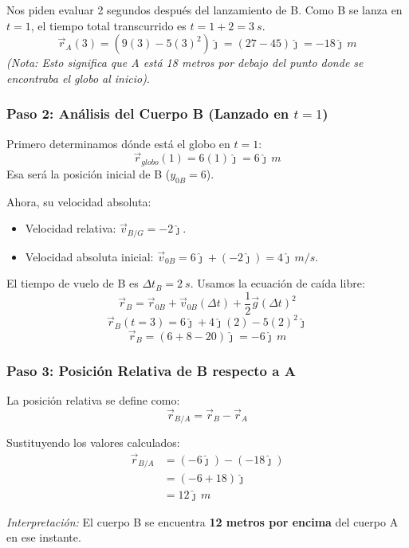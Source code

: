 \documentclass[12pt, a4paper]{article}
\begin{document}
Nos piden evaluar 2 segundos después del lanzamiento de B. Como B se lanza en $t=1$, el tiempo total transcurrido es $t = 1 + 2 = \SI{3}{s}$.
$$ \vec{r}_A(3) = (9(3) - 5(3)^2)\hat{\jmath} = (27 - 45)\hat{\jmath} = -18\hat{\jmath} \, \si{m} $$
\textit{(Nota: Esto significa que A está 18 metros por debajo del punto donde se encontraba el globo al inicio)}.

\subsubsection*{Paso 2: Análisis del Cuerpo B (Lanzado en $t=1$)}
Primero determinamos dónde está el globo en $t=1$:
$$ \vec{r}_{globo}(1) = 6(1)\hat{\jmath} = 6\hat{\jmath} \, \si{m} $$
Esa será la posición inicial de B ($y_{0B} = 6$).

Ahora, su velocidad absoluta:
\begin{itemize}
    \item Velocidad relativa: $\vec{v}_{B/G} = -2\hat{\jmath}$.
    \item Velocidad absoluta inicial: $\vec{v}_{0B} = 6\hat{\jmath} + (-2\hat{\jmath}) = 4\hat{\jmath} \, \si{m/s}$.
\end{itemize}

El tiempo de vuelo de B es $\Delta t_B = \SI{2}{s}$. Usamos la ecuación de caída libre:
$$ \vec{r}_B = \vec{r}_{0B} + \vec{v}_{0B}(\Delta t) + \frac{1}{2}\vec{g}(\Delta t)^2 $$
$$ \vec{r}_B(t=3) = 6\hat{\jmath} + 4\hat{\jmath}(2) - 5(2)^2\hat{\jmath} $$
$$ \vec{r}_B = (6 + 8 - 20)\hat{\jmath} = -6\hat{\jmath} \, \si{m} $$

\subsubsection*{Paso 3: Posición Relativa de B respecto a A}
La posición relativa se define como:
\begin{equation}
    \vec{r}_{B/A} = \vec{r}_B - \vec{r}_A
\end{equation}

Sustituyendo los valores calculados:
\begin{align*}
    \vec{r}_{B/A} &= (-6\hat{\jmath}) - (-18\hat{\jmath}) \\
    &= (-6 + 18)\hat{\jmath} \\
    &= 12\hat{\jmath} \, \si{m}
\end{align*}

\textit{Interpretación:} El cuerpo B se encuentra \textbf{12 metros por encima} del cuerpo A en ese instante.
\end{document}
